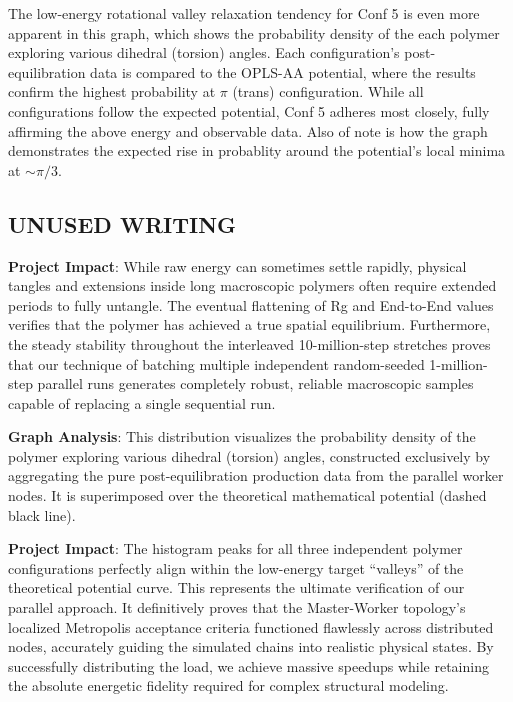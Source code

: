 The low-energy rotational valley relaxation tendency for Conf 5 is even
more apparent in this graph, which shows the probability density of the
each polymer exploring various dihedral (torsion) angles. Each
configuration's post-equilibration data is compared to the OPLS-AA
potential, where the results confirm the highest probability at \(\pi\)
(trans) configuration. While all configurations follow the expected
potential, Conf 5 adheres most closely, fully affirming the above energy
and observable data. Also of note is how the graph demonstrates the
expected rise in probablity around the potential's local minima at
\(\sim \pi/3\).

\subsection{UNUSED WRITING}\label{unused-writing}

\textbf{Project Impact}: While raw energy can sometimes settle rapidly,
physical tangles and extensions inside long macroscopic polymers often
require extended periods to fully untangle. The eventual flattening of
Rg and End-to-End values verifies that the polymer has achieved a true
spatial equilibrium. Furthermore, the steady stability throughout the
interleaved 10-million-step stretches proves that our technique of
batching multiple independent random-seeded 1-million-step parallel runs
generates completely robust, reliable macroscopic samples capable of
replacing a single sequential run.

\textbf{Graph Analysis}: This distribution visualizes the probability
density of the polymer exploring various dihedral (torsion) angles,
constructed exclusively by aggregating the pure post-equilibration
production data from the parallel worker nodes. It is superimposed over
the theoretical mathematical potential (dashed black line).

\textbf{Project Impact}: The histogram peaks for all three independent
polymer configurations perfectly align within the low-energy target
``valleys'' of the theoretical potential curve. This represents the
ultimate verification of our parallel approach. It definitively proves
that the Master-Worker topology's localized Metropolis acceptance
criteria functioned flawlessly across distributed nodes, accurately
guiding the simulated chains into realistic physical states. By
successfully distributing the load, we achieve massive speedups while
retaining the absolute energetic fidelity required for complex
structural modeling.
